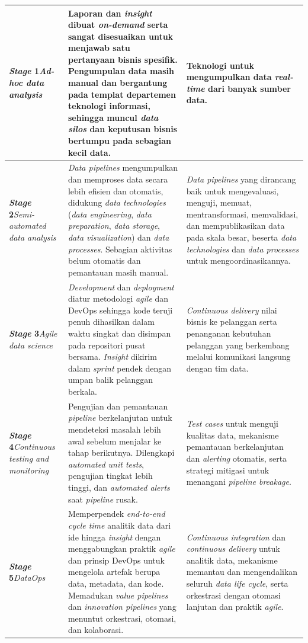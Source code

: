 {\begin{longtable}{|>{\centering\arraybackslash}m{2.5cm}|>{\raggedright\arraybackslash}m{5.95cm}|>{\raggedright\arraybackslash}m{4.8cm}|}
\textbf{\textit{Stage} 1}\newline \textit{Ad-hoc data analysis} & Laporan dan \textit{insight} dibuat \textit{on-demand} serta sangat disesuaikan untuk menjawab satu pertanyaan bisnis spesifik. Pengumpulan data masih manual dan bergantung pada templat departemen teknologi informasi, sehingga muncul \textit{data silos} dan keputusan bisnis bertumpu pada sebagian kecil data. & Teknologi untuk mengumpulkan data \textit{real-time} dari banyak sumber data. \\
\hline
\textbf{\textit{Stage} 2}\newline \textit{Semi-automated data analysis} & \textit{Data pipelines} mengumpulkan dan memproses data secara lebih efisien dan otomatis, didukung \textit{data technologies} (\textit{data engineering}, \textit{data preparation}, \textit{data storage}, \textit{data visualization}) dan \textit{data processes}. Sebagian aktivitas belum otomatis dan pemantauan masih manual. & \textit{Data pipelines} yang dirancang baik untuk mengevaluasi, menguji, memuat, mentransformasi, memvalidasi, dan mempublikasikan data pada skala besar, beserta \textit{data technologies} dan \textit{data processes} untuk mengoordinasikannya. \\
\hline
\textbf{\textit{Stage} 3}\newline \textit{Agile data science} & \textit{Development} dan \textit{deployment} diatur metodologi \textit{agile} dan DevOps sehingga kode teruji penuh dihasilkan dalam waktu singkat dan disimpan pada repositori pusat bersama. \textit{Insight} dikirim dalam \textit{sprint} pendek dengan umpan balik pelanggan berkala. & \textit{Continuous delivery} nilai bisnis ke pelanggan serta penanganan kebutuhan pelanggan yang berkembang melalui komunikasi langsung dengan tim data. \\
\hline
\textbf{\textit{Stage} 4}\newline \textit{Continuous testing and monitoring} & Pengujian dan pemantauan \textit{pipeline} berkelanjutan untuk mendeteksi masalah lebih awal sebelum menjalar ke tahap berikutnya. Dilengkapi \textit{automated unit tests}, pengujian tingkat lebih tinggi, dan \textit{automated alerts} saat \textit{pipeline} rusak. & \textit{Test cases} untuk menguji kualitas data, mekanisme pemantauan berkelanjutan dan \textit{alerting} otomatis, serta strategi mitigasi untuk menangani \textit{pipeline breakage}. \\
\hline
\textbf{\textit{Stage} 5}\newline \textit{DataOps} & Memperpendek \textit{end-to-end cycle time} analitik data dari ide hingga \textit{insight} dengan menggabungkan praktik \textit{agile} dan prinsip DevOps untuk mengelola artefak berupa data, metadata, dan kode. Memadukan \textit{value pipelines} dan \textit{innovation pipelines} yang menuntut orkestrasi, otomasi, dan kolaborasi. & \textit{Continuous integration} dan \textit{continuous delivery} untuk analitik data, mekanisme memantau dan mengendalikan seluruh \textit{data life cycle}, serta orkestrasi dengan otomasi lanjutan dan praktik \textit{agile}. \\

\end{longtable}}
